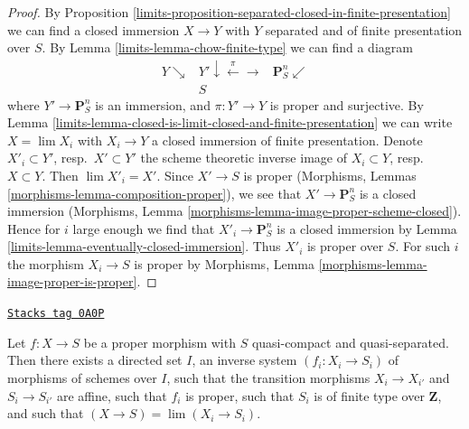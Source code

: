 \begin{proof}

By Proposition \ref{limits-proposition-separated-closed-in-finite-presentation}
we can find a closed immersion $X \to Y$ with $Y$ separated and of
finite presentation over $S$. By Lemma \ref{limits-lemma-chow-finite-type}
we can find a diagram
$$
\begin{array}{ccc}Y \searrow & Y' \downarrow\overset{\pi}{\longleftarrow}\longrightarrow & \mathbf{P}^n_S \swarrow \\  & S & \end{array}
$$
where $Y' \to \mathbf{P}^n_S$ is an immersion, and
$\pi : Y' \to Y$ is proper and surjective. By
Lemma \ref{limits-lemma-closed-is-limit-closed-and-finite-presentation}
we can write $X = \lim X_i$ with $X_i \to Y$ a closed immersion of
finite presentation. Denote $X'_i \subset Y'$, resp.\ $X' \subset Y'$
the scheme theoretic inverse image of $X_i \subset Y$, resp.\ $X \subset Y$.
Then $\lim X'_i = X'$. Since $X' \to S$ is proper
(Morphisms, Lemmas \ref{morphisms-lemma-composition-proper}), we see that
$X' \to \mathbf{P}^n_S$ is a closed immersion (Morphisms, Lemma
\ref{morphisms-lemma-image-proper-scheme-closed}). Hence for $i$ large enough
we find that $X'_i \to \mathbf{P}^n_S$ is a closed immersion by
Lemma \ref{limits-lemma-eventually-closed-immersion}.
Thus $X'_i$ is proper over $S$.
For such $i$ the morphism $X_i \to S$ is proper by
Morphisms, Lemma \ref{morphisms-lemma-image-proper-is-proper}.
\end{proof}

\begin{lemma}
\label{limits-lemma-proper-limit-of-proper-finite-presentation-noetherian}
\href{https://stacks.math.columbia.edu/tag/0A0P}{\texttt{Stacks tag 0A0P}}

Let $f : X \to S$ be a proper morphism with $S$ quasi-compact and
quasi-separated. Then there exists a directed set $I$, an
inverse system $(f_i : X_i \to S_i)$ of morphisms of schemes over $I$,
such that the transition morphisms $X_i \to X_{i'}$ and $S_i \to S_{i'}$
are affine, such that $f_i$ is proper, such that $S_i$ is of finite
type over $\mathbf{Z}$, and such that
$(X \to S) = \lim (X_i \to S_i)$.
\end{lemma}

